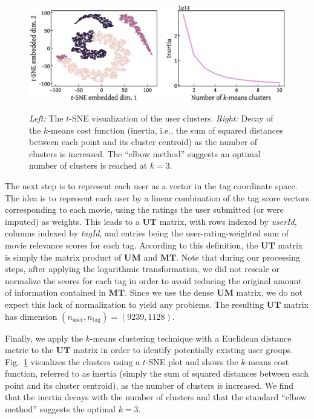 \documentclass[dvipsnames]{article}
\begin{document}
\begin{figure}
    \centering
    \includegraphics[width=\textwidth]{tsne.eps}\\
    \caption{{\it Left:} The $t$-SNE visualization of the user clusters. {\it Right:} Decay of the $k$-means cost function (inertia, i.e., the sum of squared distances between each point and its cluster centroid) as the number of clusters is increased. The ``elbow method'' suggests an optimal number of clusters is reached at $k=3$.}
    \label{fig:tsne}
\end{figure}

The next step is to represent each user as a vector in the tag coordinate space. The idea is to represent each user by a linear combination of the tag score vectors corresponding to each movie, using the ratings the user submitted (or were imputed) as weights. This leads to a $\mathbf{UT}$ matrix, with rows indexed by \textit{userId}, columns indexed by \textit{tagId}, and entries being the user-rating-weighted sum of movie relevance scores for each tag. According to this definition, the $\mathbf{UT}$ matrix is simply the matrix product of $\mathbf{UM}$ and $\mathbf{MT}$. Note that during our processing steps, after applying the logarithmic transformation, we did not rescale or normalize the scores for each tag in order to avoid reducing the original amount of information contained in $\mathbf{MT}$. Since we use the dense $\mathbf{UM}$ matrix, we do not expect this lack of normalization to yield any problems. The resulting $\mathbf{UT}$ matrix has dimension $(n_\mathrm{user}, n_\mathrm{tag}) = (9239, 1128)$.

Finally, we apply the $k$-means clustering technique with a Euclidean distance metric to the $\mathbf{UT}$ matrix in order to identify potentially existing user groups. Fig.~\ref{fig:tsne} visualizes the clusters using a $t$-SNE plot \citep{tsne} and shows the $k$-means cost function, referred to as inertia (simply the sum of squared distances between each point and its cluster centroid), as the number of clusters is increased. We find that the inertia decays with the number of clusters and that the standard ``elbow method'' suggests the optimal $k = 3$. 
\end{document}
